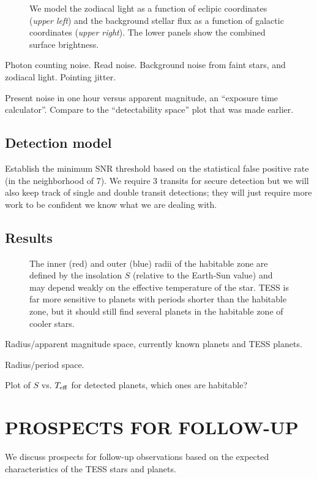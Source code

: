 \documentclass{emulateapj}
\begin{document}
\begin{figure*}[ht]
\caption{We model the zodiacal light as a function of eclipic coordinates (\textit{upper left}) and the background stellar flux as a function of galactic coordinates (\textit{upper right}). The lower panels show the combined surface brightness.}
\end{figure*}

Photon counting noise. Read noise. Background noise from faint stars, and zodiacal
light. Pointing jitter.

Present noise in one hour versus apparent magnitude, an ``exposure
time calculator''. Compare to the ``detectability space'' plot that
was made earlier.


\subsection{Detection model}

Establish the minimum SNR threshold based on the statistical false
positive rate (in the neighborhood of 7). We require 3 transits for
secure detection but we will also keep track of single and double
transit detections; they will just require more work to be confident
we know what we are dealing with.

\subsection{Results}

\begin{figure}[ht]
\caption{The inner (red) and outer (blue) radii of the habitable zone are defined by the insolation $S$ (relative to the Earth-Sun value) and may depend weakly on the effective temperature of the star. TESS is far more sensitive to planets with periods shorter than the habitable zone, but it should still find several planets in the habitable zone of cooler stars.}
\end{figure}


Radius/apparent magnitude space, currently known planets and TESS
planets.
 
Radius/period space.

Plot of $S$ vs. $T_{\rm eff}$ for detected planets, which ones are
habitable?

\section{PROSPECTS FOR FOLLOW-UP}
\label{sec:followup}
We discuss prospects for follow-up observations based on the expected
characteristics of the TESS stars and planets.
\end{document}
